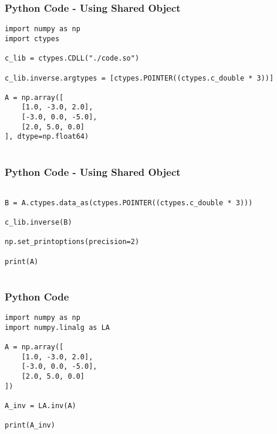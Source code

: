 \documentclass{beamer}
\begin{document}
\begin{frame}[fragile]
    \frametitle{Python Code - Using Shared Object}
    \begin{lstlisting}
import numpy as np
import ctypes

c_lib = ctypes.CDLL("./code.so")

c_lib.inverse.argtypes = [ctypes.POINTER((ctypes.c_double * 3))]

A = np.array([
    [1.0, -3.0, 2.0],
    [-3.0, 0.0, -5.0],
    [2.0, 5.0, 0.0]
], dtype=np.float64)


\end{lstlisting}
\end{frame}

\begin{frame}[fragile]
    \frametitle{Python Code - Using Shared Object}
    \begin{lstlisting}

B = A.ctypes.data_as(ctypes.POINTER((ctypes.c_double * 3)))

c_lib.inverse(B)

np.set_printoptions(precision=2)

print(A)


\end{lstlisting}
\end{frame}



\begin{frame}[fragile]
    \frametitle{Python Code}
    \begin{lstlisting}
import numpy as np
import numpy.linalg as LA

A = np.array([
    [1.0, -3.0, 2.0],
    [-3.0, 0.0, -5.0],
    [2.0, 5.0, 0.0]
])

A_inv = LA.inv(A)

print(A_inv)


\end{lstlisting}
\end{frame}
\end{document}
